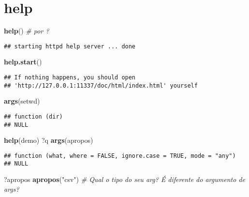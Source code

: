 \documentclass[]{article}
\newenvironment{Shaded}{\begin{snugshade}}{\end{snugshade}}
\newcommand{\KeywordTok}[1]{\textcolor[rgb]{0.13,0.29,0.53}{\textbf{#1}}}
\newcommand{\StringTok}[1]{\textcolor[rgb]{0.31,0.60,0.02}{#1}}
\newcommand{\CommentTok}[1]{\textcolor[rgb]{0.56,0.35,0.01}{\textit{#1}}}
\newcommand{\NormalTok}[1]{#1}
\begin{document}
\section{help}\label{help}

\begin{Shaded}
\begin{Highlighting}[]
\KeywordTok{help}\NormalTok{() }\CommentTok{# por ?}
\end{Highlighting}
\end{Shaded}

\begin{verbatim}
## starting httpd help server ... done
\end{verbatim}

\begin{Shaded}
\begin{Highlighting}[]
\KeywordTok{help.start}\NormalTok{()}
\end{Highlighting}
\end{Shaded}

\begin{verbatim}
## If nothing happens, you should open
## 'http://127.0.0.1:11337/doc/html/index.html' yourself
\end{verbatim}

\begin{Shaded}
\begin{Highlighting}[]
\KeywordTok{args}\NormalTok{(setwd)}
\end{Highlighting}
\end{Shaded}

\begin{verbatim}
## function (dir) 
## NULL
\end{verbatim}

\begin{Shaded}
\begin{Highlighting}[]
\KeywordTok{help}\NormalTok{(demo)}
\NormalTok{?q}
\KeywordTok{args}\NormalTok{(apropos)}
\end{Highlighting}
\end{Shaded}

\begin{verbatim}
## function (what, where = FALSE, ignore.case = TRUE, mode = "any") 
## NULL
\end{verbatim}

\begin{Shaded}
\begin{Highlighting}[]
\NormalTok{?apropos}
\KeywordTok{apropos}\NormalTok{(}\StringTok{"csv"}\NormalTok{) }\CommentTok{# Qual o tipo do seu arg? É diferente do argumento de args?}
\end{Highlighting}
\end{Shaded}
\end{document}
